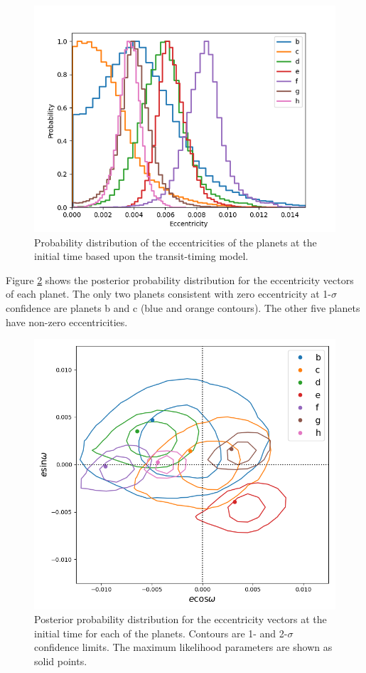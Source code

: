 \documentclass[fleqn,usenatbib]{mnras} %
\begin{document}
\begin{figure}
    \centering
    \includegraphics[width=\hsize]{figures/eccentricity_posterior.png}
    \caption{Probability distribution of the eccentricities of the planets at the initial time
    based upon the transit-timing model.}
    \label{fig:eccentricity_posterior}
\end{figure}


Figure \ref{fig:eccentricity_vectors} shows the posterior probability distribution 
for the eccentricity vectors of each planet.  The only two planets consistent with 
zero eccentricity at 1-$\sigma$ confidence are planets b and
c (blue and orange contours).  The other five planets have non-zero eccentricities.

\begin{figure}
    \centering
    \includegraphics[width=\hsize]{figures/esin_vs_ecos.png}
    \caption{Posterior probability distribution for the eccentricity vectors  at the
    initial time for each of the planets.  Contours are 1- and 2-$\sigma$ confidence limits.  
    The maximum likelihood parameters are shown as solid points.}
    \label{fig:eccentricity_vectors}
\end{figure}
\end{document}

